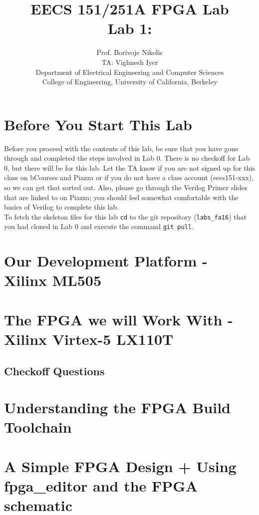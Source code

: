 \documentclass[11pt]{article}
\begin{document}
\title{EECS 151/251A FPGA Lab\\
Lab 1: }

\author{Prof. Borivoje Nikolic \\
TA: Vighnesh Iyer \\Department of Electrical Engineering and Computer Sciences\\
College of Engineering, University of California, Berkeley}
\date{}
\maketitle

\section{Before You Start This Lab}

Before you proceed with the contents of this lab, be sure that you have gone through and completed the steps involved in Lab 0. There is no checkoff for Lab 0, but there will be for this lab. Let the TA know if you are not signed up for this class on bCourses and Piazza or if you do not have a class account (eecs151-xxx), so we can get that sorted out. Also, please go through the Verilog Primer slides that are linked to on Piazza; you should feel somewhat comfortable with the basics of Verilog to complete this lab.\\

To fetch the skeleton files for this lab \verb|cd| to the git repository (\verb|labs_fa16|) that you had cloned in Lab 0 and execute the command \verb|git pull|.

\section{Our Development Platform - Xilinx ML505}

\section{The FPGA we will Work With - Xilinx Virtex-5 LX110T}

\subsection{Checkoff Questions}

\section{Understanding the FPGA Build Toolchain}

\section{A Simple FPGA Design + Using fpga\_editor and the FPGA schematic}

\section{}
\end{document}
